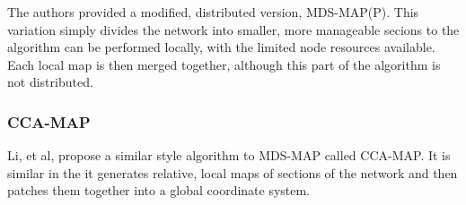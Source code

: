 The authors provided a modified, distributed version, MDS-MAP(P)\cite{MDS-MAP(P)}.  This variation simply divides the network into smaller, more manageable secions to the algorithm can be performed locally, with the limited node resources available.  Each local map is then merged together, although this part of the algorithm is not distributed.

\subsubsection{CCA-MAP} \label{sec:CCA-MAP}
\cite{CCA-MAP07,CCA-MAP09}
Li, et al, propose a similar style algorithm to MDS-MAP called CCA-MAP.  It is similar in the it generates relative, local maps of sections of the network and then patches them together into a global coordinate system.  
